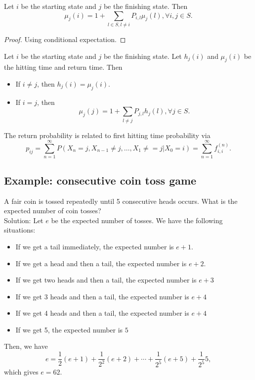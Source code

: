 \begin{refsection}
\begin{lemma}\cite[104]{privault2013understanding}\label{ch:markov-chains:th:governingequationreturntime}
Let $i$ be the starting state and $j$ be the finishing state. Then
$$\mu_j(i) = 1 + \sum_{l\in S,l\neq i}P_{i,l}\mu_j(l),\forall i,j\in S.$$
\end{lemma}
\begin{proof}
Using conditional expectation.
\end{proof}


\begin{remark}\cite[104]{privault2013understanding}\hfill
Let $i$ be the starting state and $j$ be the finishing state. Let $h_j(i)$ and $\mu_j(i)$  be the hitting time and return time. Then
\begin{itemize}
	\item If $i \neq j$, then $h_j(i) = \mu_j(i)$.
	\item If $i = j$, then $$\mu_j(j) = 1 + \sum_{l\neq j}P_{j,l}h_j(l), \forall j\in S.$$
\end{itemize}
\end{remark}


\begin{lemma}
The return probability is related to first hitting time probability via
$$p_{ij} = \sum_{n=1}^\infty P(X_n=j,X_{n-1}\neq j, \dots, X_1 \neq =j|X_0 = i) = \sum_{n=1}^\infty f_{i,i}^{(n)}.$$
\end{lemma}






\subsection{Example: consecutive coin toss game}

\begin{example}A fair coin is tossed repeatedly until 5 consecutive heads occurs. What is the expected number of coin tosses?\\
	Solution: Let $e$ be the expected number of tosses. 
	We have the following situations:
	\begin{itemize}
		\item If we get a tail immediately, the expected number is $e+1$.
		\item If we get a head and then a tail, the expected number is $e+2$.
		\item If we get two heads and then a tail, the expected number is $e+3$ 
		\item If we get 3 heads and then a tail, the expected number is $e+4$ 
		\item If we get 4 heads and then a tail, the expected number is $e+4$
		\item If we get 5, the expected number is $5$  
	\end{itemize}
	Then, we have
	$$e = \frac{1}{2}(e+1) + \frac{1}{2^2}(e + 2) + \cdots + \frac{1}{2^5}(e+5) + \frac{1}{2^5}5,$$
	which gives $e = 62$.
\end{example}


\end{refsection}
